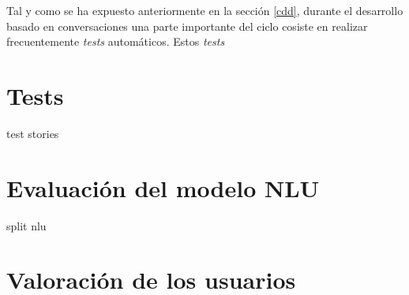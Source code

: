 Tal y como se ha expuesto anteriormente en la sección \ref{cdd}, durante el desarrollo basado en conversaciones una parte importante del ciclo cosiste en realizar frecuentemente \textit{tests} automáticos. Estos \textit{tests} 

\section{Tests}
test stories
\cite{rasaTests}

\section{Evaluación del modelo NLU}
split nlu 

\section{Valoración de los usuarios}
\cite{cuq}
\cite{spanishSUS}
